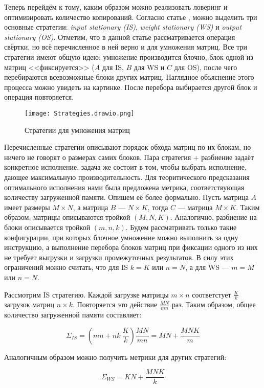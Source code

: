Теперь перейдём к тому, каким образом можно реализовать ловеринг и
оптимизировать количество копирований. Согласно статье \cite{matmul-strategies}, можно выделить
три основные стратегии: \textit{input stationary (IS)}, \textit{weight stationary (WS)}
и \textit{output stationary (OS)}. Отметим, что в данной статье рассматривается
операция свёртки, но всё перечисленное в ней верно и для умножения матриц.
Все три стратегии имеют общую идею: умножение производится блочно, блок одной из
матриц <<фиксируется>> ($A$ для IS, $B$ для WS и $C$ для OS), после чего
перебираются всевозможные блоки других матриц. Наглядное объяснение этого
процесса можно увидеть на картинке. После перебора выбирается другой блок и
операция повторяется.

\begin{figure}[h!]
    \centering
    \texttt{[image: Strategies.drawio.png]}
    \caption{Стратегии для умножения матриц}
\end{figure}

Перечисленные стратегии описывают порядок обхода матриц по их блокам, но ничего
не говорят о размерах самих блоков. Пара стратегия + разбиение задаёт конкретное
исполнение, задача же состоит в том, чтобы выбрать исполнение, дающее
максимальную производительность. Для теоритического предсказания оптимального
исполнения нами была предложена метрика, соответствующая количеству загруженной
памяти. Опишем её более формально. Пусть матрица $A$ имеет размеры $M \times N$, а
матрица $B$ --- $N \times K$, тогда $C$ --- матрица $M \times K$. Таким образом,
матрицы описываются тройкой $(M, N, K)$. Аналогично, разбиение на блоки
описывается тройкой $(m, n, k)$. Будем рассматривать только такие конфигурации,
при которых блочное умножение можно выполнить за одну инструкцию, а выполнение
перебора блоков матриц при фиксации одного из них не требует выгрузки и загрузки
промежуточных результатов. В силу этих ограничений можно считать, что для IS
$k = K$ или $n = N$, а для WS --- $m = M$ или $n = N$.

Рассмотрим IS стратегию. Каждой загрузке матрицы $m \times n$ соответстует
$\frac{K}{k}$ загрузок матриц $n \times k$. Повторяется это действие
$\frac{MN}{mn}$ раз. Таким образом, общее количество загруженной памяти
составляет:

\[
    \Sigma_{IS} = \left( mn + nk ~ \frac{K}{k} \right) \frac{MN}{mn} = MN + \frac{MNK}{m}
\]

Аналогичным образом можно получить метрики для других стратегий:

\[
    \Sigma_{WS} = KN + \frac{MNK}{k}
\]

